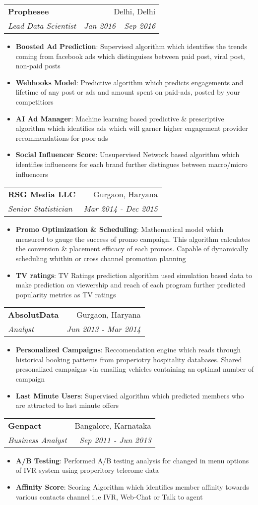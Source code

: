 \documentclass[letterpaper,11pt]{article}
\makeatletter
\newcommand{\resumeItem}[2]{
  \item\small{
    \textbf{#1}{: #2 \vspace{-2pt}}
  }
}
\newcommand{\resumeSubheading}[4]{
  \vspace{-1pt}\item
    \begin{tabular*}{0.97\textwidth}{l@{\extracolsep{\fill}}r}
      \textbf{#1} & #2 \\
      \textit{\small#3} & \textit{\small #4} \\
    \end{tabular*}\vspace{-5pt}
}
\newcommand{\resumeItemListStart}{\begin{itemize}}
\newcommand{\resumeItemListEnd}{\end{itemize}\vspace{-5pt}}
\makeatother
\begin{document}
       \resumeSubheading
      {Prophesee}{Delhi, Delhi}
      {Lead Data Scientist}{Jan 2016 - Sep 2016}
      \resumeItemListStart
        \resumeItem{Boosted Ad Prediction}
          {Supervised algorithm which identifies the trends coming from facebook ads which distinguises between paid post, viral post, non-paid posts}
        \resumeItem{Webhooks Model}
          {Predictive algorithm which predicts engagements and lifetime of any post or ads and amount spent on paid-ads, posted by your competitiors}
        \resumeItem{AI Ad Manager}
        {Machine learning based predictive \& prescriptive algorithm which identifies ads which will garner higher engagement provider recommendations for poor ads}
        \resumeItem{Social Influencer Score}
        {Unsupervised Network based algorithm which identifies influencers for each brand further distingues between macro/micro influencers}
      \resumeItemListEnd
      
       \resumeSubheading
      {RSG Media LLC}{Gurgaon, Haryana}
      {Senior Statistician}{Mar 2014 - Dec 2015}
      \resumeItemListStart
        \resumeItem{Promo Optimization \& Scheduling}
          {Mathematical model which measured to gauge the success of promo campaign. This algorithm calculates the conversion \& placement efficacy of each promos. Capable of dynamically scheduling whithin or cross channel promotion planning}
        \resumeItem{TV ratings}
          {TV Ratings prediction algorithm used simulation based data to make prediction on viewership and reach of each program further predicted popularity metrics as TV ratings }
      \resumeItemListEnd
      
       \resumeSubheading
      {AbsolutData}{Gurgaon, Haryana}
      {Analyst}{Jun 2013 - Mar 2014}
      \resumeItemListStart
        \resumeItem{Personalized Campaigns}
          {Reccomendation engine which reads through historical booking patterns from properiotry hospitality databases. Shared presonalized campaigns via emailing vehicles containing an optimal number of campaign}
        \resumeItem{Last Minute Users}
          {Supervised algorithm which predicted members who are attracted to last minute offers}
      \resumeItemListEnd
      
      

    \resumeSubheading
      {Genpact}{Bangalore, Karnataka}
      {Business Analyst}{Sep 2011 - Jun 2013}
      \resumeItemListStart
        \resumeItem{A/B Testing}
          {Performed A/B testing analysis for changed in menu options of IVR system using properitory telecome data}
        \resumeItem{Affinity Score}
          {Scoring Algorithm which identifies member affinity towards various contacts channel i.,e IVR, Web-Chat or Talk to agent}
        \resumeItemListEnd
\end{document}
